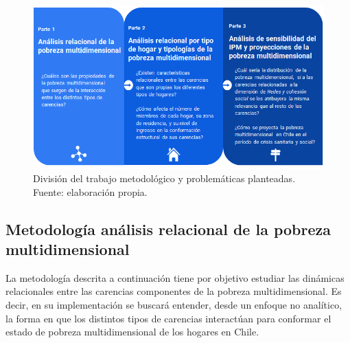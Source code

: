 \documentclass[12pt,letterpaper,spanish]{article}
\begin{document}
\begin{figure}[H]
    \centering
    \includegraphics[width=\textwidth]{Max/intro_metodologia.png}
    \caption{División del trabajo metodológico y problemáticas planteadas. Fuente: elaboración propia.}
    \label{intro_metodologia}
\end{figure}






\newpage
\subsection{Metodología análisis relacional de la pobreza multidimensional}

La metodología descrita a continuación tiene por objetivo estudiar las dinámicas relacionales entre las carencias componentes de la pobreza multidimensional. Es decir, en su implementación se buscará entender, desde un enfoque no analítico, la forma en que los distintos tipos de carencias interactúan para conformar el estado de pobreza multidimensional de los hogares en Chile.
\end{document}
